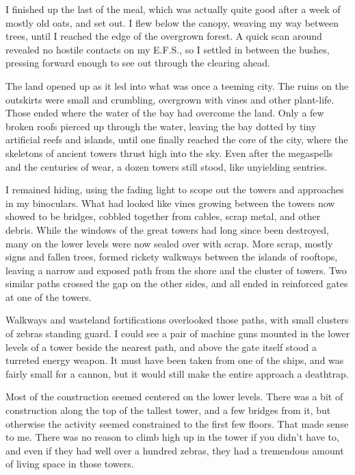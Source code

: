 I finished up the last of the meal, which was actually quite good after a week of mostly old oats, and set out. I flew below the canopy, weaving my way between trees, until I reached the edge of the overgrown forest. A quick scan around revealed no hostile contacts on my E.F.S., so I settled in between the bushes, pressing forward enough to see out through the clearing ahead.

The land opened up as it led into what was once a teeming city. The ruins on the outskirts were small and crumbling, overgrown with vines and other plant-life. Those ended where the water of the bay had overcome the land. Only a few broken roofs pierced up through the water, leaving the bay dotted by tiny artificial reefs and islands, until one finally reached the core of the city, where the skeletons of ancient towers thrust high into the sky. Even after the megaspells and the centuries of wear, a dozen towers still stood, like unyielding sentries.

I remained hiding, using the fading light to scope out the towers and approaches in my binoculars. What had looked like vines growing between the towers now showed to be bridges, cobbled together from cables, scrap metal, and other debris. While the windows of the great towers had long since been destroyed, many on the lower levels were now sealed over with scrap. More scrap, mostly signs and fallen trees, formed rickety walkways between the islands of rooftops, leaving a narrow and exposed path from the shore and the cluster of towers. Two similar paths crossed the gap on the other sides, and all ended in reinforced gates at one of the towers.

Walkways and wasteland fortifications overlooked those paths, with small clusters of zebras standing guard. I could see a pair of machine guns mounted in the lower levels of a tower beside the nearest path, and above the gate itself stood a turreted energy weapon. It must have been taken from one of the ships, and was fairly small for a cannon, but it would still make the entire approach a deathtrap.

Most of the construction seemed centered on the lower levels. There was a bit of construction along the top of the tallest tower, and a few bridges from it, but otherwise the activity seemed constrained to the first few floors. That made sense to me. There was no reason to climb high up in the tower if you didn’t have to, and even if they had well over a hundred zebras, they had a tremendous amount of living space in those towers.

